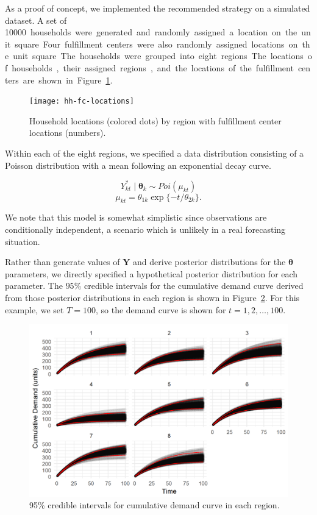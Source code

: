 \documentclass[11pt, oneside]{article}   	%
\begin{document}
As a proof of concept, we implemented the recommended strategy on a simulated dataset.  A set of \SI{10000} households were generated and randomly assigned a location on the unit square.  Four fulfillment centers were also randomly assigned locations on the unit square.  The households were grouped into eight regions.  The locations of households, their assigned regions, and the locations of the fulfillment centers are shown in Figure~\ref{fi:hhfclocs}.

\begin{figure}
\centering
\texttt{[image: hh-fc-locations]}
\caption{Household locations (colored dots) by region with fulfillment center locations (numbers).}  \label{fi:hhfclocs}
\end{figure}

Within each of the eight regions, we specified a data distribution consisting of a Poisson distribution with a mean following an exponential decay curve.

$$Y_{kt}^* \mid \boldsymbol{\theta}_{k} \sim Poi(\mu_{kt})$$
$$\mu_{kt} = \theta_{1k} \exp \{ -t / \theta_{2k} \}.$$

\noindent We note that this model is somewhat simplistic since observations are conditionally independent, a scenario which is unlikely in a real forecasting situation.

Rather than generate values of $\mathbf{Y}$ and derive posterior distributions for the $\boldsymbol{\theta}$ parameters, we directly specified a hypothetical posterior distribution for each parameter.  The $95\%$ credible intervals for the cumulative demand curve derived from those posterior distributions in each region is shown in Figure~\ref{fi:demcurve}.  For this example, we set $T = 100$, so the demand curve is shown for $t = 1, 2, \ldots, 100$.

\begin{figure}
\centering
\includegraphics{demand-curve-95pct}
\caption{95\% credible intervals for cumulative demand curve in each region.}  \label{fi:demcurve}
\end{figure}
\end{document}
